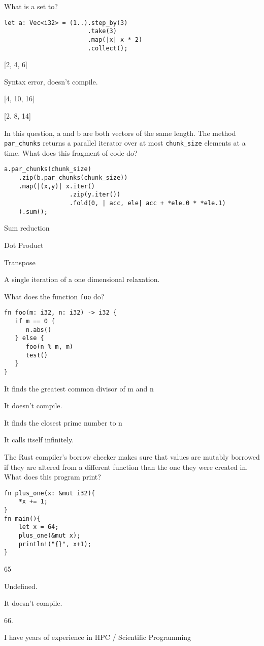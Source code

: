 \documentclass[11pt]{article} %
\newcommand*\choice{\item}
\begin{document}
\begin{multiplechoice}[choices=1]
What is a set to?

\begin{lstlisting}
let a: Vec<i32> = (1..).step_by(3)
                       .take(3)
                       .map(|x| x * 2)
                       .collect();
\end{lstlisting}

  \choice {[2, 4, 6]}
  \choice Syntax error, doesn't compile.
  \choice {[4, 10, 16]}
  \choice {[2. 8, 14]}
\end{multiplechoice}

\begin{multiplechoice}[choices=1]
In this question, a and b are both vectors of the same length. The method \texttt{par\_chunks} returns a parallel iterator over at most \texttt{chunk\_size} elements at a time. What does this fragment of code do?
\begin{lstlisting}
a.par_chunks(chunk_size)
    .zip(b.par_chunks(chunk_size))
    .map(|(x,y)| x.iter()
                  .zip(y.iter())
                  .fold(0, | acc, ele| acc + *ele.0 * *ele.1)
    ).sum();

\end{lstlisting}

\choice Sum reduction
\choice Dot Product
\choice Transpose
\choice A single iteration of a one dimensional relaxation.

\end{multiplechoice}
\begin{multiplechoice}[choices=1]
What does the function \texttt{foo} do?
\begin{lstlisting}
fn foo(m: i32, n: i32) -> i32 {
   if m == 0 {
      n.abs()
   } else {
      foo(n % m, m)
      test()
   }
}
\end{lstlisting}
  \choice It finds the greatest common divisor of m and n
  \choice It doesn't compile.
  \choice It finds the closest prime number to n
  \choice It calls itself infinitely.
\end{multiplechoice}
\begin{multiplechoice}[choices=1]
The Rust compiler's borrow checker makes sure that values are mutably borrowed if they are altered from a different function than the one they were created in. What does this program print?
\begin{lstlisting}
fn plus_one(x: &mut i32){
    *x += 1;
}
fn main(){
    let x = 64;
    plus_one(&mut x);
    println!("{}", x+1);
}
\end{lstlisting}
  \choice 65
  \choice Undefined.
  \choice It doesn't compile.
  \choice 66.
\end{multiplechoice}
\begin{exercise}
I have \blank{}  years of experience in HPC / Scientific Programming
\end{exercise}
\end{document}
